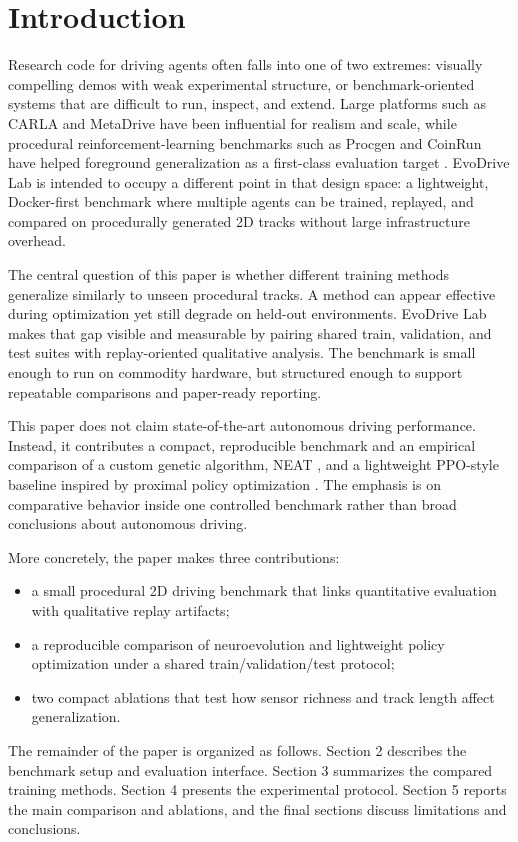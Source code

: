 \section{Introduction}

Research code for driving agents often falls into one of two extremes: visually compelling demos with weak experimental structure, or benchmark-oriented systems that are difficult to run, inspect, and extend. Large platforms such as CARLA and MetaDrive have been influential for realism and scale, while procedural reinforcement-learning benchmarks such as Procgen and CoinRun have helped foreground generalization as a first-class evaluation target \cite{carla2017, metadrive2021, procgen2019, coinrun2018}. EvoDrive Lab is intended to occupy a different point in that design space: a lightweight, Docker-first benchmark where multiple agents can be trained, replayed, and compared on procedurally generated 2D tracks without large infrastructure overhead.

The central question of this paper is whether different training methods generalize similarly to unseen procedural tracks. A method can appear effective during optimization yet still degrade on held-out environments. EvoDrive Lab makes that gap visible and measurable by pairing shared train, validation, and test suites with replay-oriented qualitative analysis. The benchmark is small enough to run on commodity hardware, but structured enough to support repeatable comparisons and paper-ready reporting.

This paper does not claim state-of-the-art autonomous driving performance. Instead, it contributes a compact, reproducible benchmark and an empirical comparison of a custom genetic algorithm, NEAT \cite{stanley2002}, and a lightweight PPO-style baseline inspired by proximal policy optimization \cite{schulman2017}. The emphasis is on comparative behavior inside one controlled benchmark rather than broad conclusions about autonomous driving.

More concretely, the paper makes three contributions:
\begin{itemize}[leftmargin=1.5em]
    \item a small procedural 2D driving benchmark that links quantitative evaluation with qualitative replay artifacts;
    \item a reproducible comparison of neuroevolution and lightweight policy optimization under a shared train/validation/test protocol;
    \item two compact ablations that test how sensor richness and track length affect generalization.
\end{itemize}

The remainder of the paper is organized as follows. Section 2 describes the benchmark setup and evaluation interface. Section 3 summarizes the compared training methods. Section 4 presents the experimental protocol. Section 5 reports the main comparison and ablations, and the final sections discuss limitations and conclusions.
